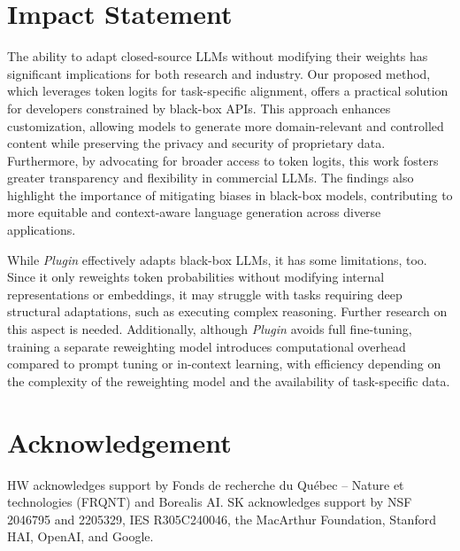 \section*{Impact Statement}
The ability to adapt closed-source LLMs without modifying their weights has significant implications for both research and industry. 
Our proposed method, which leverages token logits for task-specific alignment, offers a practical solution for developers constrained by black-box APIs. 
This approach enhances customization, allowing models to generate more domain-relevant and controlled content while preserving the privacy and security of proprietary data. 
Furthermore, by advocating for broader access to token logits, this work fosters greater transparency and flexibility in commercial LLMs. 
The findings also highlight the importance of mitigating biases in black-box models, contributing to more equitable and context-aware language generation across diverse applications.

While \textit{Plugin} effectively adapts black-box LLMs, it has some limitations, too. Since it only reweights token probabilities without modifying internal representations or embeddings, it may struggle with tasks requiring deep structural adaptations, such as executing complex reasoning. Further research on this aspect is needed. Additionally, although \textit{Plugin} avoids full fine-tuning, training a separate reweighting model introduces computational overhead compared to prompt tuning or in-context learning, with efficiency depending on the complexity of the reweighting model and the availability of task-specific data.


\section*{Acknowledgement}
HW acknowledges support by Fonds de recherche du Québec – Nature et technologies (FRQNT) and Borealis AI.
SK acknowledges support by NSF 2046795 and 2205329, IES R305C240046, the MacArthur Foundation, Stanford HAI, OpenAI, and Google.